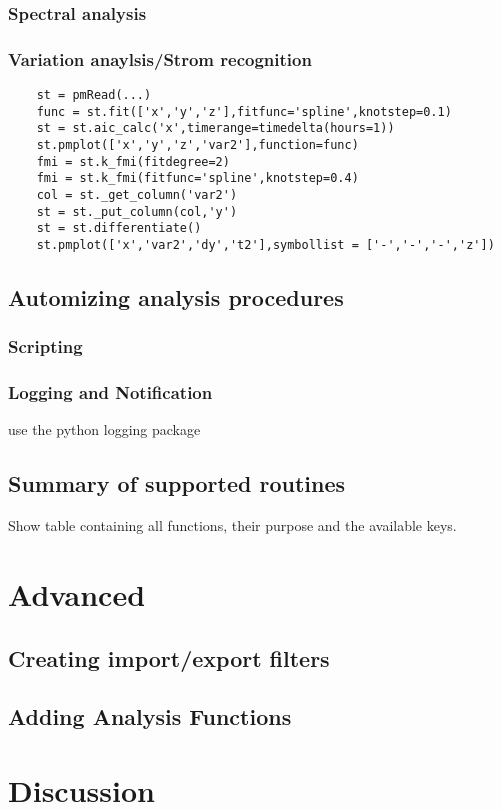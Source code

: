 \subsubsection{Spectral analysis}

\subsubsection{Variation anaylsis/Strom recognition}

\begin{verbatim}
    st = pmRead(...)
    func = st.fit(['x','y','z'],fitfunc='spline',knotstep=0.1)
    st = st.aic_calc('x',timerange=timedelta(hours=1))
    st.pmplot(['x','y','z','var2'],function=func)
    fmi = st.k_fmi(fitdegree=2)
    fmi = st.k_fmi(fitfunc='spline',knotstep=0.4)
    col = st._get_column('var2')
    st = st._put_column(col,'y')
    st = st.differentiate()
    st.pmplot(['x','var2','dy','t2'],symbollist = ['-','-','-','z'])
\end{verbatim}


\subsection{Automizing analysis procedures}

\subsubsection{Scripting}

\subsubsection{Logging and Notification}

use the python logging package

\subsection{Summary of supported routines}

Show table containing all functions, their purpose and the available keys.

\section{Advanced}

\subsection{Creating import/export filters}

\subsection{Adding Analysis Functions}

\section{Discussion}


